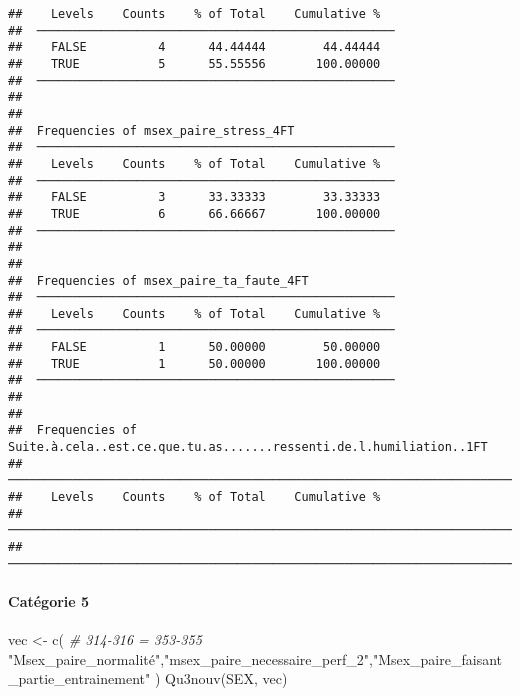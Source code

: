 \documentclass[
]{article}
\newenvironment{Shaded}{\begin{snugshade}}{\end{snugshade}}
\newcommand{\CommentTok}[1]{\textcolor[rgb]{0.56,0.35,0.01}{\textit{#1}}}
\newcommand{\FunctionTok}[1]{\textcolor[rgb]{0.00,0.00,0.00}{#1}}
\newcommand{\NormalTok}[1]{#1}
\newcommand{\OtherTok}[1]{\textcolor[rgb]{0.56,0.35,0.01}{#1}}
\newcommand{\StringTok}[1]{\textcolor[rgb]{0.31,0.60,0.02}{#1}}
\begin{document}
\begin{verbatim}
##    Levels    Counts    % of Total    Cumulative %   
##  ────────────────────────────────────────────────── 
##    FALSE          4      44.44444        44.44444   
##    TRUE           5      55.55556       100.00000   
##  ────────────────────────────────────────────────── 
## 
## 
##  Frequencies of msex_paire_stress_4FT               
##  ────────────────────────────────────────────────── 
##    Levels    Counts    % of Total    Cumulative %   
##  ────────────────────────────────────────────────── 
##    FALSE          3      33.33333        33.33333   
##    TRUE           6      66.66667       100.00000   
##  ────────────────────────────────────────────────── 
## 
## 
##  Frequencies of msex_paire_ta_faute_4FT             
##  ────────────────────────────────────────────────── 
##    Levels    Counts    % of Total    Cumulative %   
##  ────────────────────────────────────────────────── 
##    FALSE          1      50.00000        50.00000   
##    TRUE           1      50.00000       100.00000   
##  ────────────────────────────────────────────────── 
## 
## 
##  Frequencies of Suite.à.cela..est.ce.que.tu.as.......ressenti.de.l.humiliation..1FT 
##  ────────────────────────────────────────────────────────────────────────────────── 
##    Levels    Counts    % of Total    Cumulative %   
##  ────────────────────────────────────────────────────────────────────────────────── 
##  ──────────────────────────────────────────────────────────────────────────────────
\end{verbatim}

\hypertarget{catuxe9gorie-5}{%
\paragraph{Catégorie 5}\label{catuxe9gorie-5}}

\begin{Shaded}
\begin{Highlighting}[]
\NormalTok{vec }\OtherTok{\textless{}{-}} \FunctionTok{c}\NormalTok{(  }\CommentTok{\# 314{-}316 = 353{-}355}
  \StringTok{"Msex\_paire\_normalité"}\NormalTok{,}\StringTok{"msex\_paire\_necessaire\_perf\_2"}\NormalTok{,}\StringTok{"Msex\_paire\_faisant\_partie\_entrainement"}
\NormalTok{)}
\FunctionTok{Qu3nouv}\NormalTok{(SEX, vec)}
\end{Highlighting}
\end{Shaded}
\end{document}
